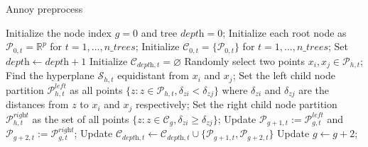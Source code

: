 \documentclass{article}
\begin{document}
\begin{algorithm}[!b]
  \caption{Annoy preprocess}
  \label{alg:annoypre}
  \begin{algorithmic}[1]
    \STATE Initialize the node index $g=0$ and tree $\textit{depth}=0$;
    \STATE Initialize each root node as $\mathcal{P}_{0,t}=\mathbb{R}^p$ for $t=1,\dots,\textit{n\_trees}$;
    \STATE Initialize $\mathcal{C}_{0,t}=\{\mathcal{P}_{0,t}\}$ for $t=1,\dots,\textit{n\_trees}$;
        \STATE Set $\textit{depth}\leftarrow \textit{depth}+1$
        \STATE Initialize $\mathcal{C}_{\textit{depth},t}=\varnothing$
        \STATE Randomly select two points $x_i,x_j\in\mathcal{P}_{h,t}$;
        \STATE Find the hyperplane $\mathcal{S}_{h,t}$ equidistant from $x_i$ and $x_j$;
        \STATE Set the left child node partition $\mathcal{P}^{\textit{left}}_{h,t}$ as all points $\{z:z\in\mathcal{P}_{h,t},\delta_{zi}<\delta_{zj}\}$ where $\delta_{zi}$ and $\delta_{zj}$ are the distances from $z$ to $x_i$ and $x_j$ respectively;
        \STATE Set the right child node partition $\mathcal{P}^{\textit{right}}_{h,t}$ as the set of all points $\{z:z\in\mathcal{C}_g,\delta_{zi}\geq \delta_{zj}\}$;
        \STATE Update $\mathcal{P}_{g+1,t}:=\mathcal{P}_{g,t}^{\textit{left}}$ and $\mathcal{P}_{g+2,t}:=\mathcal{P}_{g,t}^{\textit{right}}$;
        \STATE Update $\mathcal{C}_{\textit{depth},t}\leftarrow\mathcal{C}_{\textit{depth},t}\cup\{\mathcal{P}_{g+1,t},\mathcal{P}_{g+2,t}\}$
        \STATE Update $g\leftarrow g+2$;
        \ENDFOR
      \ENDWHILE
    \ENDFOR
  \end{algorithmic}
\end{algorithm}
\end{document}
